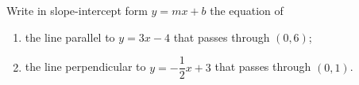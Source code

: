 Write in slope-intercept form $y=mx+b$ the equation of
\begin{enumerate}
\item[(a)] the line parallel to $y=3x-4$ that passes through $(0,6)$;
\item[(b)] the line perpendicular to $y=-\dfrac12x+3$ that passes through $(0,1)$.
\end{enumerate}

